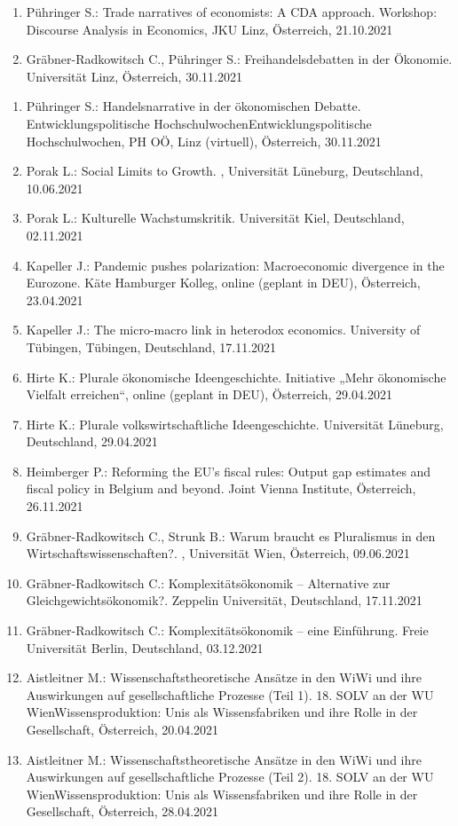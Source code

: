 \begin{enumerate}
	\item Pühringer S.: Trade narratives of economists: A CDA approach. Workshop: Discourse Analysis in Economics, JKU Linz, Österreich, 21.10.2021
	\item Gräbner-Radkowitsch C., Pühringer S.: Freihandelsdebatten in der Ökonomie. Universität Linz, Österreich, 30.11.2021
\end{enumerate}

\begin{enumerate}
	\item Pühringer S.: Handelsnarrative in der ökonomischen Debatte. Entwicklungspolitische HochschulwochenEntwicklungspolitische Hochschulwochen, PH OÖ, Linz (virtuell), Österreich, 30.11.2021
	\item Porak L.: Social Limits to Growth. , Universität Lüneburg, Deutschland, 10.06.2021
	\item Porak L.: Kulturelle Wachstumskritik. Universität Kiel, Deutschland, 02.11.2021
	\item Kapeller J.: Pandemic pushes polarization: Macroeconomic divergence in the Eurozone. Käte Hamburger Kolleg, online (geplant in DEU), Österreich, 23.04.2021
	\item Kapeller J.: The micro-macro link in heterodox economics. University of Tübingen, Tübingen, Deutschland, 17.11.2021
	\item Hirte K.: Plurale ökonomische Ideengeschichte. Initiative „Mehr ökonomische Vielfalt erreichen“, online (geplant in DEU), Österreich, 29.04.2021
	\item Hirte K.: Plurale volkswirtschaftliche Ideengeschichte. Universität Lüneburg, Deutschland, 29.04.2021
	\item Heimberger P.: Reforming the EU’s fiscal rules: Output gap estimates and fiscal policy in Belgium and beyond. Joint Vienna Institute, Österreich, 26.11.2021
	\item Gräbner-Radkowitsch C., Strunk B.: Warum braucht es Pluralismus in den Wirtschaftswissenschaften?. , Universität Wien, Österreich, 09.06.2021
	\item Gräbner-Radkowitsch C.: Komplexitätsökonomik – Alternative zur Gleichgewichtsökonomik?. Zeppelin Universität, Deutschland, 17.11.2021
	\item Gräbner-Radkowitsch C.: Komplexitätsökonomik – eine Einführung. Freie Universität Berlin, Deutschland, 03.12.2021
	\item Aistleitner M.: Wissenschaftstheoretische Ansätze in den WiWi und ihre Auswirkungen auf gesellschaftliche Prozesse (Teil 1). 18. SOLV an der WU WienWissensproduktion: Unis als Wissensfabriken und ihre Rolle in der Gesellschaft, Österreich, 20.04.2021
	\item Aistleitner M.: Wissenschaftstheoretische Ansätze in den WiWi und ihre Auswirkungen auf gesellschaftliche Prozesse (Teil 2). 18. SOLV an der WU WienWissensproduktion: Unis als Wissensfabriken und ihre Rolle in der Gesellschaft, Österreich, 28.04.2021
\end{enumerate}

